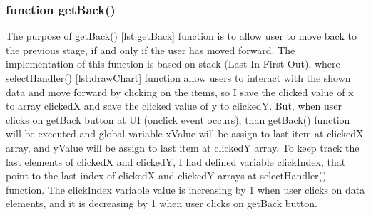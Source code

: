 \documentclass[11pt]{article}
\begin{document}
\subsubsection{function getBack()}
The purpose of getBack() \ref{lst:getBack} function is to allow user to move back to the previous stage, if and only if the user has moved forward. The implementation of this function is based on stack (Last In First Out), where selectHandler() \ref{lst:drawChart} function allow users to interact with the shown data and move forward by clicking on the items, so I save the clicked value of x to array clickedX and save the clicked value of y to clickedY. But, when user clicks on getBack button at UI (onclick event occurs), than getBack() function will be executed and global variable xValue will be assign to last item at clickedX array, and yValue will be assign to last item at clickedY array. To keep track the last elements of clickedX and clickedY, I had defined variable clickIndex, that point to the last index of clickedX and clickedY arrays at selectHandler() function. The clickIndex variable value is increasing by 1 when user clicks on data elements, and it is decreasing by 1 when user clicks on getBack button.
\end{document}
